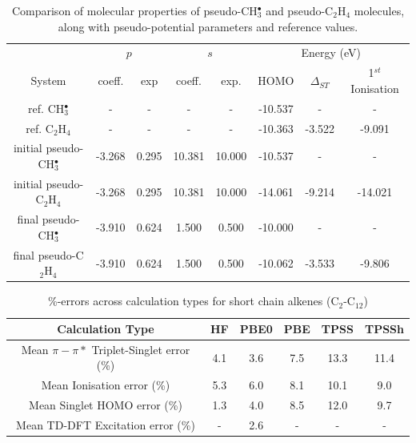 \documentclass[12pt]{article}
\begin{document}
\begin{table}[h]
\begin{tabular}{c | c c c c | c c c}
\hline
 & \multicolumn{2}{c}{$p$} & \multicolumn{2}{c}{$s$} & \multicolumn{3}{|c}{Energy (eV)} \\
System & coeff. & exp & coeff. & exp. & HOMO & $\Delta_{ST}$ & 1$^{st}$ Ionisation \\
\hline
ref. CH$^{\bullet}_{3}$ & - & - & - & - & -10.537 & - & - \\
ref. C$_{2}$H$_{4}$ & - & - & - & - & -10.363 & -3.522 & -9.091 \\
\hline
initial pseudo-CH$^{\bullet}_{3}$ & -3.268 & 0.295 & 10.381 & 10.000 & -10.537 & - & - \\
initial pseudo-C$_{2}$H$_{4}$ & -3.268 & 0.295 & 10.381 & 10.000 & -14.061 & -9.214 & -14.021\\
\hline
final pseudo-CH$^{\bullet}_{3}$ & -3.910 & 0.624 & 1.500 & 0.500 & -10.000 & - & - \\
final pseudo-C$_{2}$H$_{4}$ & -3.910 & 0.624 & 1.500 & 0.500 & -10.062 & -3.533 & -9.806 \\
\hline
\end{tabular}
\caption{\label{table:potential_params} Comparison of molecular properties of pseudo-CH$^{\bullet}_{3}$ and pseudo-C$_{2}$H$_{4}$ molecules, along with pseudo-potential parameters and reference values.}
\end{table}


\newpage

\begin{table}[h]
\begin{tabular}{c c c c c c }
\hline
Calculation Type & HF & PBE0 & PBE & TPSS & TPSSh \\
\hline
Mean \(\pi - \pi*\) Triplet-Singlet error (\%) & 4.1 & 3.6 & 7.5 & 13.3 & 11.4 \\
Mean Ionisation error (\%) & 5.3 & 6.0 & 8.1 & 10.1 & 9.0 \\
Mean Singlet HOMO error (\%) & 1.3 & 4.0 & 8.5 & 12.0 & 9.7 \\
Mean TD-DFT Excitation error (\%) & - & 2.6 & - & - & - \\ 
\hline
\end{tabular}
\caption{\%-errors across calculation types for short chain alkenes  (C\(_{2}\)-C\(_{12}\))}
\label{table:alkene_errors}
\end{table}

\newpage
\end{document}
